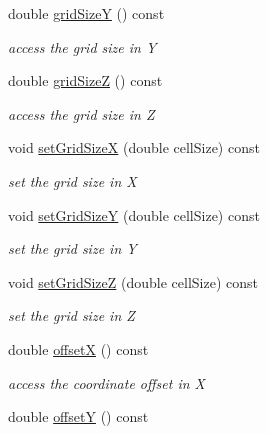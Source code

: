 \begin{DoxyCompactItemize}
double \hyperlink{class_d_d4hep_1_1_geometry_1_1_cartesian_grid_x_y_z_a17a5b8021969c68770ac29b5098609e8}{gridSizeY} () const 
\begin{DoxyCompactList}\small\item\em access the grid size in Y \item\end{DoxyCompactList}\item 
double \hyperlink{class_d_d4hep_1_1_geometry_1_1_cartesian_grid_x_y_z_a3110ef4e4523ec9572b30e39ba81af07}{gridSizeZ} () const 
\begin{DoxyCompactList}\small\item\em access the grid size in Z \item\end{DoxyCompactList}\item 
void \hyperlink{class_d_d4hep_1_1_geometry_1_1_cartesian_grid_x_y_z_ad46064a7fa3c563a4287e07706305484}{setGridSizeX} (double cellSize) const 
\begin{DoxyCompactList}\small\item\em set the grid size in X \item\end{DoxyCompactList}\item 
void \hyperlink{class_d_d4hep_1_1_geometry_1_1_cartesian_grid_x_y_z_a80f4136e55f603d6fdfe77856cabdd97}{setGridSizeY} (double cellSize) const 
\begin{DoxyCompactList}\small\item\em set the grid size in Y \item\end{DoxyCompactList}\item 
void \hyperlink{class_d_d4hep_1_1_geometry_1_1_cartesian_grid_x_y_z_ac085488b1e2c7ebf657fe0ee6bc89c03}{setGridSizeZ} (double cellSize) const 
\begin{DoxyCompactList}\small\item\em set the grid size in Z \item\end{DoxyCompactList}\item 
double \hyperlink{class_d_d4hep_1_1_geometry_1_1_cartesian_grid_x_y_z_a52efce9910232c17e8188ad32196d3e6}{offsetX} () const 
\begin{DoxyCompactList}\small\item\em access the coordinate offset in X \item\end{DoxyCompactList}\item 
double \hyperlink{class_d_d4hep_1_1_geometry_1_1_cartesian_grid_x_y_z_ae2fbfd0517ed5b6eedbd65cbf504bec9}{offsetY} () const 

\end{DoxyCompactItemize}
